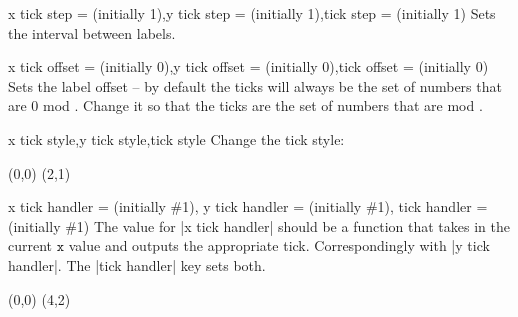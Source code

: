 \begin{sseqdata}[|| name = ex1, cohomological Serre grading]
\begin{keylist}{x tick step =  (initially 1),y tick step =  (initially 1),tick step =  (initially 1)}
Sets the interval between labels.
\end{keylist}

\begin{keylist}{x tick offset =  (initially 0),y tick offset =  (initially 0),tick offset =  (initially 0)}
Sets the label offset -- by default the ticks will always be the set of numbers that are 0 mod . Change it so that the ticks are the set of numbers that are  mod .
\end{keylist}

\begin{stylekeylist}{x tick style,y tick style,tick style}
Change the tick style:
\begin{codeexample}[width = 7cm]
\begin{sseqpage}[ tick style = { blue, font = \tiny } ]
\class(0,0) \class(2,1)
\end{sseqpage}
\end{codeexample}
\end{stylekeylist}

\begin{keylist}{x tick handler =  (initially \#1), y tick handler =  (initially \#1), tick handler =  (initially \#1)}
The value for |x tick handler| should be a function that takes in the current $\mathtt{x}$ value and outputs the appropriate tick. Correspondingly with |y tick handler|. The |tick handler| key sets both.
\begin{codeexample}[width = 7cm]
\begin{sseqpage}[ x range = {0}{4}, yscale = 1.78,
    x tick handler = {
        \ifnum#1 = 0\relax
            0
        \else
            \ifnum#1 = 1\relax
                \protect\vphantom{2}n
            \else
                #1n
            \fi
        \fi
    }
]
\class(0,0)
\class(4,2)
\end{sseqpage}
\end{codeexample}
\end{keylist}


\end{sseqdata}
